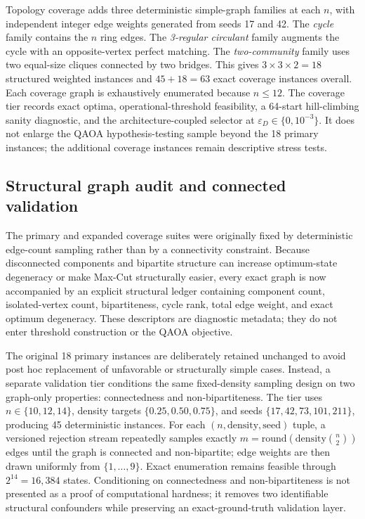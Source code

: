 \documentclass[5p,times]{elsarticle}
\begin{document}
Topology coverage adds three deterministic simple-graph families at each $n$, with independent integer edge weights generated from seeds 17 and 42. The \emph{cycle} family contains the $n$ ring edges. The \emph{3-regular circulant} family augments the cycle with an opposite-vertex perfect matching. The \emph{two-community} family uses two equal-size cliques connected by two bridges. This gives $3\times3\times2=18$ structured weighted instances and $45+18=63$ exact coverage instances overall. Each coverage graph is exhaustively enumerated because $n\leq12$. The coverage tier records exact optima, operational-threshold feasibility, a 64-start hill-climbing sanity diagnostic, and the architecture-coupled selector at $\varepsilon_D\in\{0,10^{-3}\}$. It does not enlarge the QAOA hypothesis-testing sample beyond the 18 primary instances; the additional coverage instances remain descriptive stress tests.

\subsection{Structural graph audit and connected validation}
The primary and expanded coverage suites were originally fixed by deterministic edge-count sampling rather than by a connectivity constraint. Because disconnected components and bipartite structure can increase optimum-state degeneracy or make Max-Cut structurally easier, every exact graph is now accompanied by an explicit structural ledger containing component count, isolated-vertex count, bipartiteness, cycle rank, total edge weight, and exact optimum degeneracy. These descriptors are diagnostic metadata; they do not enter threshold construction or the QAOA objective.

The original 18 primary instances are deliberately retained unchanged to avoid post hoc replacement of unfavorable or structurally simple cases. Instead, a separate validation tier conditions the same fixed-density sampling design on two graph-only properties: connectedness and non-bipartiteness. The tier uses $n\in\{10,12,14\}$, density targets $\{0.25,0.50,0.75\}$, and seeds $\{17,42,73,101,211\}$, producing 45 deterministic instances. For each $(n,\mathrm{density},\mathrm{seed})$ tuple, a versioned rejection stream repeatedly samples exactly $m=\mathrm{round}(\mathrm{density}\binom{n}{2})$ edges until the graph is connected and non-bipartite; edge weights are then drawn uniformly from $\{1,\ldots,9\}$. Exact enumeration remains feasible through $2^{14}=16{,}384$ states. Conditioning on connectedness and non-bipartiteness is not presented as a proof of computational hardness; it removes two identifiable structural confounders while preserving an exact-ground-truth validation layer.
\end{document}
